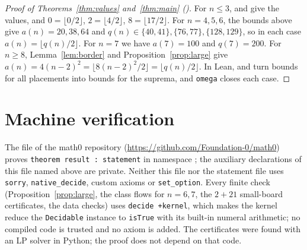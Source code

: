 \documentclass[11pt]{amsart}
\theoremstyle{plain}
\theoremstyle{definition}
\begin{document}
\begin{proof}[Proof of Theorems~\ref{thm:values} and~\ref{thm:main} \textup{()}]
For $n\le3$,  and  give the values, and $0=\lfloor0/2\rfloor$, $2=\lfloor4/2\rfloor$, $8=\lfloor17/2\rfloor$. For $n=4,5,6$, the bounds above give $a(n)=20,38,64$ and $q(n)\in\{40,41\},\{76,77\},\{128,129\}$, so in each case $a(n)=\lfloor q(n)/2\rfloor$. For $n=7$ we have $a(7)=100$ and $q(7)=200$. For $n\ge8$, Lemma~\ref{lem:border} and Proposition~\ref{prop:large} give $a(n)=4(n-2)^2=\lfloor8(n-2)^2/2\rfloor=\lfloor q(n)/2\rfloor$. In Lean,  and  turn bounds for all placements into bounds for the suprema, and \texttt{omega} closes each case.
\end{proof}

\section{Machine verification}\label{sec:lean}

The file  of the math0 repository (\url{https://github.com/Foundation-0/math0}) proves \texttt{theorem result : statement} in namespace ; the auxiliary declarations of this file named above are private. Neither this file nor the statement file uses \texttt{sorry}, \texttt{native\_decide}, custom axioms or \texttt{set\_option}. Every finite check (Proposition~\ref{prop:large}, the class flows for $n=6,7$, the $2+21$ small-board certificates, the data checks) uses \texttt{decide +kernel}, which makes the kernel reduce the \texttt{Decidable} instance to \texttt{isTrue} with its built-in numeral arithmetic; no compiled code is trusted and no axiom is added. The certificates were found with an LP solver in Python; the proof does not depend on that code.
\end{document}
